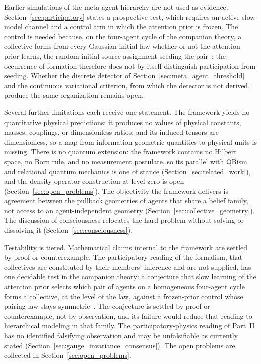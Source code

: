 \documentclass[11pt]{article}
\begin{document}
Earlier simulations of the meta-agent hierarchy are not used as evidence. Section~\ref{sec:participatory} states a prospective test, which requires an active slow model channel and a control arm in which the attention prior is frozen. The control is needed because, on the four-agent cycle of the companion theory, a collective forms from every Gaussian initial law whether or not the attention prior learns, the random initial source assignment seeding the pair~\cite[Ch.~14]{DennisGaugeVFE2026}; the occurrence of formation therefore does not by itself distinguish participation from seeding. Whether the discrete detector of Section~\ref{sec:meta_agent_threshold} and the continuous variational criterion, from which the detector is not derived, produce the same organization remains open.

Several further limitations each receive one statement. The framework yields no quantitative physical predictions: it produces no values of physical constants, masses, couplings, or dimensionless ratios, and its induced tensors are dimensionless, so a map from information-geometric quantities to physical units is missing. There is no quantum extension: the framework contains no Hilbert space, no Born rule, and no measurement postulate, so its parallel with QBism and relational quantum mechanics is one of stance (Section~\ref{sec:related_work}), and the density-operator construction at level zero is open (Section~\ref{sec:open_problems}). The objectivity the framework delivers is agreement between the pullback geometries of agents that share a belief family, not access to an agent-independent geometry (Section~\ref{sec:collective_geometry}). The discussion of consciousness relocates the hard problem without solving or dissolving it (Section~\ref{sec:consciousness}).

Testability is tiered. Mathematical claims internal to the framework are settled by proof or counterexample. The participatory reading of the formalism, that collectives are constituted by their members' inference and are not supplied, has one decidable test in the companion theory: a conjecture that slow learning of the attention prior selects which pair of agents on a homogeneous four-agent cycle forms a collective, at the level of the law, against a frozen-prior control whose pairing law stays symmetric~\cite[Ch.~14]{DennisGaugeVFE2026}. The conjecture is settled by proof or counterexample, not by observation, and its failure would reduce that reading to hierarchical modeling in that family. The participatory-physics reading of Part~II has no identified falsifying observation and may be unfalsifiable as currently stated (Section~\ref{sec:gauge_invariance_consensus}). The open problems are collected in Section~\ref{sec:open_problems}.
\end{document}
